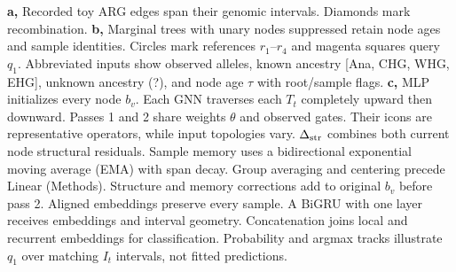 \textbf{a,} Recorded toy ARG edges span their genomic intervals. Diamonds mark recombination.
\textbf{b,} Marginal trees with unary nodes suppressed retain node ages and sample identities. Circles mark references $r_1$--$r_4$ and magenta squares query $q_1$. Abbreviated inputs show observed alleles, known ancestry [Ana, CHG, WHG, EHG], unknown ancestry (?), and node age $\tau$ with root/sample flags.
\textbf{c,} MLP initializes every node $b_v$. Each GNN traverses each $T_t$ completely upward then downward. Passes 1 and 2 share weights $\theta$ and observed gates. Their icons are representative operators, while input topologies vary. $\Delta_{\rm str}$ combines both current node structural residuals. Sample memory uses a bidirectional exponential moving average (EMA) with span decay. Group averaging and centering precede Linear (Methods). Structure and memory corrections add to original $b_v$ before pass 2. Aligned embeddings preserve every sample. A BiGRU with one layer receives embeddings and interval geometry. Concatenation joins local and recurrent embeddings for classification. Probability and argmax tracks illustrate $q_1$ over matching $I_t$ intervals, not fitted predictions.
